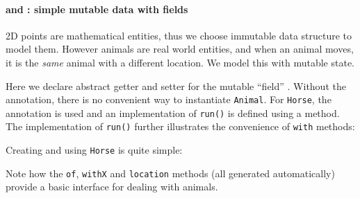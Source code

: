 %
%

\paragraph{\Q@Animal@ and \Q@Horse@: simple mutable data with fields}
2D points are mathematical entities, thus we choose immutable data structure to
model them. However animals are real world entities, and when an animal moves,
it is the \emph{same} animal with a different location. We model this with
mutable state.


\noindent Here we declare abstract getter and setter for the mutable ``field''
\Q@location@.  Without the \mixin annotation, there is no convenient way to
instantiate \texttt{Animal}.  For \texttt{Horse}, the \mixin annotation is used
and an implementation of \texttt{run()} is defined using a \Q@default@
method. The implementation of \texttt{run()} further illustrates the convenience of \texttt{with} methods:


\noindent Creating and using \texttt{Horse} is quite simple:


\noindent Note how the \texttt{of}, \texttt{withX} and
\texttt{location} methods (all generated automatically) provide a
basic interface for dealing with animals.


